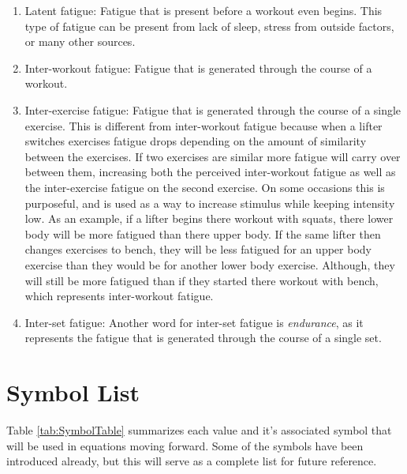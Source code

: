 \begin{enumerate}
	\item Latent fatigue: Fatigue that is present before a workout even begins. This type of fatigue can be present from lack of sleep, stress from outside factors, or many other sources.
	\item Inter-workout fatigue: Fatigue that is generated through the course of a workout.
	\item Inter-exercise fatigue: Fatigue that is generated through the course of a single exercise. This is different from inter-workout fatigue because when a lifter switches exercises fatigue drops depending on the amount of similarity between the exercises. If two exercises are similar more fatigue will carry over between them, increasing both the perceived inter-workout fatigue as well as the inter-exercise fatigue on the second exercise. On some occasions this is purposeful, and is used as a way to increase stimulus while keeping intensity low. As an example, if a lifter begins there workout with squats, there lower body will be more fatigued than there upper body. If the same lifter then changes exercises to bench, they will be less fatigued for an upper body exercise than they would be for another lower body exercise. Although, they will still be more fatigued than if they started there workout with bench, which represents inter-workout fatigue.
	\item Inter-set fatigue: Another word for inter-set fatigue is \textit{endurance}, as it represents the fatigue that is generated through the course of a single set.
\end{enumerate}


\section{Symbol List}
\label{sec:SymbolList}

Table \ref{tab:SymbolTable} summarizes each value and it's associated symbol that will be used in equations moving forward. Some of the symbols have been introduced already, but this will serve as a complete list for future reference.

